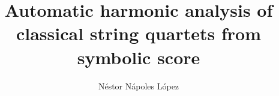 \documentclass[a4paper,12pt,twoside]{report}
\begin{document}

\title{Automatic harmonic analysis of classical string quartets from symbolic score}
\author{N\'estor N\'apoles L\'opez}

\maketitle

\maketitle
\restoregeometry

\preface
\cleardoublepage




\body

\normallinespacing













\listoffigures
\newpage
\listoftables





\end{document}

